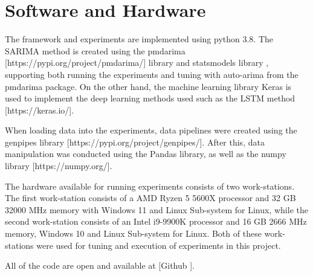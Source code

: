 
\section{Software and Hardware}
\label{section:Method:Hardware&Software}

The framework and experiments are implemented using python 3.8.
The SARIMA method is created using the pmdarima [https://pypi.org/project/pmdarima/] library and
statsmodels library ,
supporting both running the experiments and tuning with auto-arima from the pmdarima package.
On the other hand, the machine learning library Keras is used to implement the deep learning methods used such as the LSTM method
  [https://keras.io/].

When loading data into the experiments, data pipelines were created using the genpipes library [https://pypi.org/project/genpipes/].
After this, data manipulation was conducted using the Pandas library, as well as the numpy library [https://numpy.org/].

The hardware available for running experiments consists of two work-stations.
The first work-station consists of a AMD Ryzen 5 5600X processor and 32 GB 32000 MHz memory with Windows 11 and Linux Sub-system for Linux,
while the second work-station consists of an Intel i9-9900K processor and 16 GB 2666 MHz memory, Windows 10 and Linux Sub-system for Linux.
Both of these work-stations were used for tuning and execution of experiments in this project.

All of the code are open and available at [Github \cite{githubSource}].

